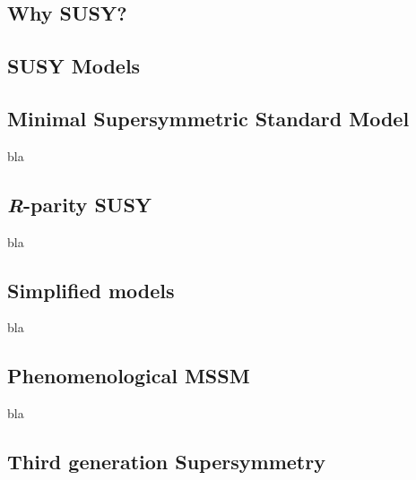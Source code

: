 		\subsection{Why SUSY?}


			

		\subsection{SUSY Models}


		\subsection*{Minimal Supersymmetric Standard Model}
			
			bla

		\subsection*{\emph{R}-parity SUSY}
		
			bla

		\subsection*{Simplified models}
		
			bla


		\subsection*{Phenomenological MSSM}
		
			bla

		\subsection{Third generation Supersymmetry}

